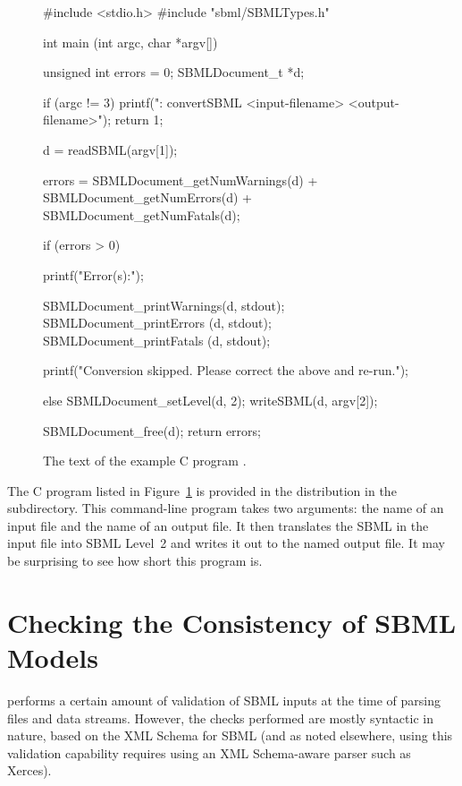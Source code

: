 \documentclass{sbmlmanual}
\begin{document}
\begin{figure}[bth]
  \begin{codeVerbatim}
#include <stdio.h>
#include "sbml/SBMLTypes.h"

int
main (int argc, char *argv[])
{
  unsigned int errors = 0;
  SBMLDocument_t *d;

  if (argc != 3)
  {
    printf("\nusage: convertSBML <input-filename> <output-filename>\n\n");
    return 1;
  }

  d = readSBML(argv[1]);

  errors = SBMLDocument_getNumWarnings(d) + SBMLDocument_getNumErrors(d) +
           SBMLDocument_getNumFatals(d);

  if (errors > 0)
  {
    printf("Error(s):\n");

    SBMLDocument_printWarnings(d, stdout);
    SBMLDocument_printErrors  (d, stdout);
    SBMLDocument_printFatals  (d, stdout);

    printf("Conversion skipped.  Please correct the above and re-run.\n");
  }
  else
  {
    SBMLDocument_setLevel(d, 2);
    writeSBML(d, argv[2]);
  }

  SBMLDocument_free(d);
  return errors;
}
  \end{codeVerbatim}
  \caption{The text of the example C program .}
  \label{fig:convert-sbml}
\end{figure}


The C program listed in Figure~\ref{fig:convert-sbml} is provided in the
\libsbml{} distribution in the  subdirectory.  This
command-line program takes two arguments: the name of an input file and the
name of an output file.  It then translates the SBML in the input file into
SBML Level~2 and writes it out to the named output file.  It may be
surprising to see how short this program is.


\section{Checking the Consistency of SBML Models}
\label{sec:consistency-checking}

\libsbml{} performs a certain amount of validation of SBML inputs at the
time of parsing files and data streams.  However, the checks performed are
mostly syntactic in nature, based on the XML Schema for SBML (and as noted
elsewhere, using this validation capability requires using an XML
Schema-aware parser such as Xerces).
\end{document}
